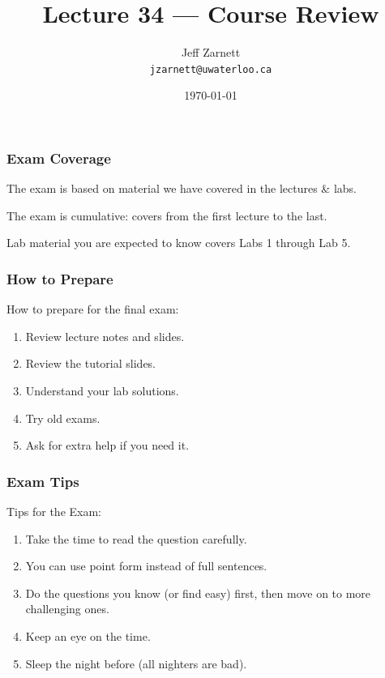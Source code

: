 

\title{Lecture 34 --- Course Review }

\author{Jeff Zarnett \\ \small \texttt{jzarnett@uwaterloo.ca}}
\date{\today}




\begin{frame}
  \titlepage

\end{frame}

\begin{frame}
\frametitle{Exam Coverage}

The exam is based on material we have covered in the lectures \& labs.

The exam is cumulative: covers from the first lecture to the last.

Lab material you are expected to know covers Labs 1 through Lab 5.

\end{frame}

\begin{frame}
\frametitle{How to Prepare}

How to prepare for the final exam:

\begin{enumerate}
	\item Review lecture notes and slides.
	\item Review the tutorial slides.
	\item Understand your lab solutions.
	\item Try old exams.
	\item Ask for extra help if you need it.
\end{enumerate}

\end{frame}

\begin{frame}
\frametitle{Exam Tips}

Tips for the Exam:

\begin{enumerate}
	\item Take the time to read the question carefully.
	\item You can use point form instead of full sentences.
	\item Do the questions you know (or find easy) first, then move on to more challenging ones.
	\item Keep an eye on the time.
	\item Sleep the night before (all nighters are bad).
	
\end{enumerate}

\end{frame}


